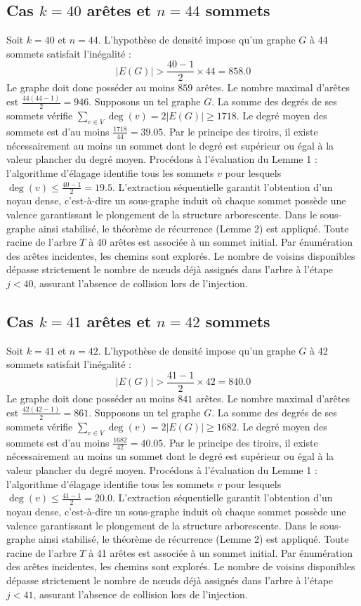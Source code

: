 \documentclass[12pt,a4paper]{article}
\begin{document}
\subsection{Cas $k = 40$ arêtes et $n = 44$ sommets}
Soit $k = 40$ et $n = 44$. L'hypothèse de densité impose qu'un graphe $G$ à 44 sommets satisfait l'inégalité :
$$ |E(G)| > \frac{40-1}{2} \times 44 = 858.0 $$
Le graphe doit donc posséder au moins $859$ arêtes. Le nombre maximal d'arêtes est $\frac{44(44-1)}{2} = 946$.
Supposons un tel graphe $G$. La somme des degrés de ses sommets vérifie $\sum_{v \in V} \deg(v) = 2|E(G)| \geq 1718$.
Le degré moyen des sommets est d'au moins $\frac{1718}{44} = 39.05$.
Par le principe des tiroirs, il existe nécessairement au moins un sommet dont le degré est supérieur ou égal à la valeur plancher du degré moyen.
Procédons à l'évaluation du Lemme 1 : l'algorithme d'élagage identifie tous les sommets $v$ pour lesquels $\deg(v) \leq \frac{40-1}{2} = 19.5$.
L'extraction séquentielle garantit l'obtention d'un noyau dense, c'est-à-dire un sous-graphe induit où chaque sommet possède une valence garantissant le plongement de la structure arborescente.
Dans le sous-graphe ainsi stabilisé, le théorème de récurrence (Lemme 2) est appliqué. Toute racine de l'arbre $T$ à 40 arêtes est associée à un sommet initial. Par énumération des arêtes incidentes, les chemins sont explorés. Le nombre de voisins disponibles dépasse strictement le nombre de nœuds déjà assignés dans l'arbre à l'étape $j < 40$, assurant l'absence de collision lors de l'injection.

\subsection{Cas $k = 41$ arêtes et $n = 42$ sommets}
Soit $k = 41$ et $n = 42$. L'hypothèse de densité impose qu'un graphe $G$ à 42 sommets satisfait l'inégalité :
$$ |E(G)| > \frac{41-1}{2} \times 42 = 840.0 $$
Le graphe doit donc posséder au moins $841$ arêtes. Le nombre maximal d'arêtes est $\frac{42(42-1)}{2} = 861$.
Supposons un tel graphe $G$. La somme des degrés de ses sommets vérifie $\sum_{v \in V} \deg(v) = 2|E(G)| \geq 1682$.
Le degré moyen des sommets est d'au moins $\frac{1682}{42} = 40.05$.
Par le principe des tiroirs, il existe nécessairement au moins un sommet dont le degré est supérieur ou égal à la valeur plancher du degré moyen.
Procédons à l'évaluation du Lemme 1 : l'algorithme d'élagage identifie tous les sommets $v$ pour lesquels $\deg(v) \leq \frac{41-1}{2} = 20.0$.
L'extraction séquentielle garantit l'obtention d'un noyau dense, c'est-à-dire un sous-graphe induit où chaque sommet possède une valence garantissant le plongement de la structure arborescente.
Dans le sous-graphe ainsi stabilisé, le théorème de récurrence (Lemme 2) est appliqué. Toute racine de l'arbre $T$ à 41 arêtes est associée à un sommet initial. Par énumération des arêtes incidentes, les chemins sont explorés. Le nombre de voisins disponibles dépasse strictement le nombre de nœuds déjà assignés dans l'arbre à l'étape $j < 41$, assurant l'absence de collision lors de l'injection.
\end{document}
